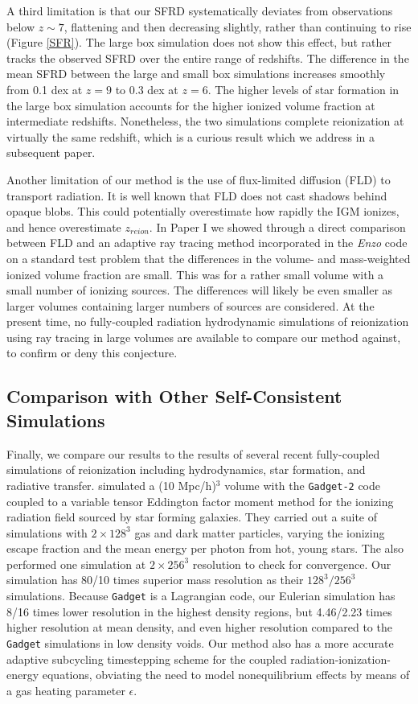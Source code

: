 A third limitation is that our SFRD systematically deviates from observations below $z \sim 7$, flattening and then decreasing slightly, rather than continuing to rise (Figure \ref{SFR}). The large box simulation does not show this effect, but rather tracks the observed SFRD over the entire range of redshifts. The difference in the mean SFRD between the large and small box simulations increases smoothly from 0.1 dex at $z=9$ to 0.3 dex at $z=6$. The higher levels of star formation in the large box simulation accounts for the higher ionized volume fraction at intermediate redshifts. Nonetheless, the two simulations complete reionization at virtually the same redshift, which is a curious result which we address in a subsequent paper.

Another limitation of our method is the use of flux-limited diffusion (FLD) to transport radiation. It is well known that FLD does not cast shadows behind opaque blobs. This could potentially overestimate how rapidly the IGM ionizes, and hence overestimate $z_{reion}$. In Paper I we showed through a direct comparison between FLD and an adaptive ray tracing method incorporated in the {\em Enzo} code on a standard test problem that the differences in the volume- and mass-weighted ionized volume fraction are small. This was for a rather small volume with a small number of ionizing sources. The differences will likely be even smaller as larger volumes containing larger numbers of sources are considered. At the present time, no fully-coupled radiation hydrodynamic simulations of reionization using ray tracing in large volumes are available to compare our method against, to confirm or deny this conjecture. 

\subsection{Comparison with Other Self-Consistent Simulations}

Finally, we compare our results to the results of several recent fully-coupled simulations of reionization including hydrodynamics, star formation, and radiative transfer. \cite{PetkovaSpringel2011a} simulated a (10 Mpc/h)$^3$ volume with the {\tt Gadget-2} code coupled to a variable tensor Eddington factor moment method for the ionizing radiation field sourced by star forming galaxies. They carried out a suite of simulations with $2 \times 128^3$ gas and dark matter particles, varying the ionizing escape fraction and the mean energy per photon from hot, young stars. The also performed one simulation at $2 \times 256^3$ resolution to check for convergence. Our simulation has 80/10 times superior mass resolution as their $128^3/256^3$ simulations. Because {\tt Gadget} is a Lagrangian code, our Eulerian simulation has 8/16 times lower resolution in the highest density regions, but 4.46/2.23 times higher resolution at mean density, and even higher resolution compared to the {\tt Gadget} simulations in low density voids. Our method also has a more accurate adaptive subcycling timestepping scheme for the coupled radiation-ionization-energy equations, obviating the need to model nonequilibrium effects by means of a gas heating parameter $\epsilon$. 

